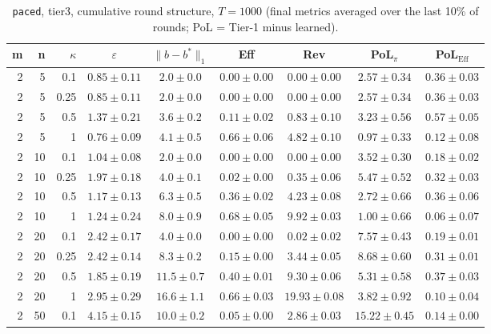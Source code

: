 \begin{table}[htbp]
\centering
\scriptsize
\caption{\texttt{paced}, tier3, cumulative round structure, $T=1000$ (final metrics averaged over the last 10\% of rounds; PoL = Tier-1 minus learned).}
\label{tab:tier3_paced_cumulative}
\begin{tabular}{@{}rrrcccccc@{}}
\toprule
m & n & $\kappa$ & $\varepsilon$ & $\|b-b^*\|_1$ & Eff & Rev & PoL$_\pi$ & PoL$_\mathrm{Eff}$ \\
\midrule
2 & 5 & 0.1 & $0.85 \pm 0.11$ & $2.0 \pm 0.0$ & $0.00 \pm 0.00$ & $0.00 \pm 0.00$ & $2.57 \pm 0.34$ & $0.36 \pm 0.03$ \\
2 & 5 & 0.25 & $0.85 \pm 0.11$ & $2.0 \pm 0.0$ & $0.00 \pm 0.00$ & $0.00 \pm 0.00$ & $2.57 \pm 0.34$ & $0.36 \pm 0.03$ \\
2 & 5 & 0.5 & $1.37 \pm 0.21$ & $3.6 \pm 0.2$ & $0.11 \pm 0.02$ & $0.83 \pm 0.10$ & $3.23 \pm 0.56$ & $0.57 \pm 0.05$ \\
2 & 5 & 1 & $0.76 \pm 0.09$ & $4.1 \pm 0.5$ & $0.66 \pm 0.06$ & $4.82 \pm 0.10$ & $0.97 \pm 0.33$ & $0.12 \pm 0.08$ \\
2 & 10 & 0.1 & $1.04 \pm 0.08$ & $2.0 \pm 0.0$ & $0.00 \pm 0.00$ & $0.00 \pm 0.00$ & $3.52 \pm 0.30$ & $0.18 \pm 0.02$ \\
2 & 10 & 0.25 & $1.97 \pm 0.18$ & $4.0 \pm 0.1$ & $0.02 \pm 0.00$ & $0.35 \pm 0.06$ & $5.47 \pm 0.52$ & $0.32 \pm 0.03$ \\
2 & 10 & 0.5 & $1.17 \pm 0.13$ & $6.3 \pm 0.5$ & $0.36 \pm 0.02$ & $4.23 \pm 0.08$ & $2.72 \pm 0.66$ & $0.36 \pm 0.06$ \\
2 & 10 & 1 & $1.24 \pm 0.24$ & $8.0 \pm 0.9$ & $0.68 \pm 0.05$ & $9.92 \pm 0.03$ & $1.00 \pm 0.66$ & $0.06 \pm 0.07$ \\
2 & 20 & 0.1 & $2.42 \pm 0.17$ & $4.0 \pm 0.0$ & $0.00 \pm 0.00$ & $0.02 \pm 0.02$ & $7.57 \pm 0.43$ & $0.19 \pm 0.01$ \\
2 & 20 & 0.25 & $2.42 \pm 0.14$ & $8.3 \pm 0.2$ & $0.15 \pm 0.00$ & $3.44 \pm 0.05$ & $8.68 \pm 0.60$ & $0.31 \pm 0.01$ \\
2 & 20 & 0.5 & $1.85 \pm 0.19$ & $11.5 \pm 0.7$ & $0.40 \pm 0.01$ & $9.30 \pm 0.06$ & $5.31 \pm 0.58$ & $0.37 \pm 0.03$ \\
2 & 20 & 1 & $2.95 \pm 0.29$ & $16.6 \pm 1.1$ & $0.66 \pm 0.03$ & $19.93 \pm 0.08$ & $3.82 \pm 0.92$ & $0.10 \pm 0.04$ \\
2 & 50 & 0.1 & $4.15 \pm 0.15$ & $10.0 \pm 0.2$ & $0.05 \pm 0.00$ & $2.86 \pm 0.03$ & $15.22 \pm 0.45$ & $0.14 \pm 0.00$ \\

\end{tabular}
\end{table}
